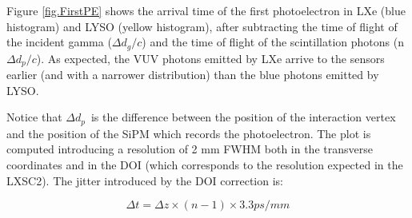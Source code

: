 \documentclass[review]{elsarticle}
\begin{document}
Figure \ref{fig.FirstPE} shows the arrival time of the first photoelectron in LXe (blue histogram) and LYSO (yellow histogram), after subtracting the time of flight of the incident gamma ($\Delta d_g/c$) and the time of flight of the scintillation photons (n \cdot $\Delta d_p/c$). As expected, the VUV photons emitted by LXe arrive to the sensors earlier (and with a narrower distribution) than the blue photons emitted by LYSO. 

Notice that $\Delta d_p$~is the difference 
between the position of the interaction vertex and the position of the SiPM which records the photoelectron. 
The plot is computed introducing a resolution of 2 mm FWHM both in the transverse coordinates and
in the DOI (which corresponds to the resolution expected in the LXSC2). The jitter introduced by the DOI correction is:

\begin{equation}
\Delta t =\Delta z \times (n-1) \times 3.3 ps/mm
\label{eq.DOI}
\end{equation}
\end{document}
